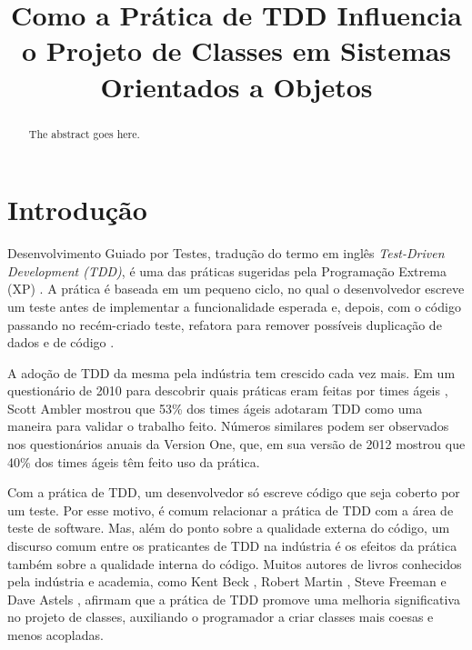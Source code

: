 \documentclass[conference]{IEEEtran}
\begin{document}
\title{Como a Prática de TDD Influencia o Projeto de Classes em Sistemas Orientados a Objetos}

\author{
}

\maketitle

\begin{abstract}
The abstract goes here.
\end{abstract}

\IEEEpeerreviewmaketitle

\section{Introdução}

Desenvolvimento Guiado por Testes, tradução do termo
em inglês \textit{Test-Driven Development (TDD)},
é uma das práticas sugeridas pela Programação
Extrema (XP) \cite{XPExplained}. A prática é baseada em um pequeno ciclo, 
no qual o desenvolvedor escreve um teste antes
de implementar a funcionalidade esperada e, depois, com o código
passando no recém-criado teste, refatora para 
remover possíveis duplicação de dados e de código \cite{TDDByExample}.

A adoção de TDD da mesma pela indústria tem crescido cada vez mais. 
Em um questionário de 2010 para descobrir quais práticas eram feitas por times
ágeis \cite{wambler-survey-agile}, Scott Ambler mostrou que 53\% dos times ágeis
adotaram TDD como uma maneira para validar o trabalho feito.
Números similares podem ser observados nos questionários anuais da Version One, que,
em sua versão de 2012 \cite{versionone-2012} mostrou que 40\% dos times ágeis têm 
feito uso da prática.

Com a prática de TDD, um desenvolvedor só escreve código
que seja coberto por um teste. Por esse motivo, é comum relacionar a prática
de TDD com a área de teste de software. Mas, além do ponto sobre
a qualidade externa do código, um discurso comum entre os praticantes de TDD
na indústria é os efeitos da prática também sobre a qualidade interna do código.
Muitos autores de livros conhecidos pela indústria e academia, como
Kent Beck \cite{TDDByExample}, Robert Martin \cite{agile-ppp}, 
Steve Freeman \cite{GOOS} e Dave Astels \cite{astels-tdd}, afirmam que a prática de TDD
promove uma melhoria significativa no projeto de classes, auxiliando
o programador a criar classes mais coesas e menos acopladas.
\end{document}
